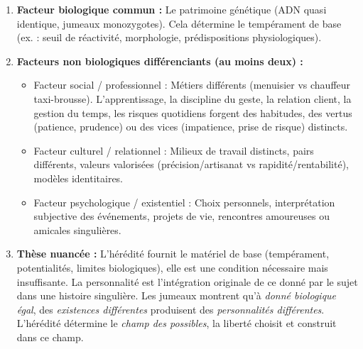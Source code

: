 \documentclass[11pt]{article}
\newcommand{\cle}[1]{{\popxbold\color{popdark}#1}}
\newcounter{popsec}
\newcounter{popsub}
\newcommand{\courssub}[1]{%
  \stepcounter{popsub}%
  \par\vspace{9pt}\noindent{\popxbold\fontsize{11.5}{13}\selectfont\color{popink}{\color{poporange}\thepopsec.\thepopsub}\hspace{6pt}#1}\par\nopagebreak\vspace{4pt}
}
\begin{document}
\courssub{Je m'entraîne}

\begin{corrige}
\begin{enumerate}
    \item \textbf{Facteur biologique commun :} Le \cle{patrimoine génétique} (ADN quasi identique, jumeaux monozygotes). Cela détermine le \cle{tempérament} de base (ex. : seuil de réactivité, morphologie, prédispositions physiologiques).
    \item \textbf{Facteurs non biologiques différenciants (au moins deux) :}
    \begin{itemize}
        \item \cle{Facteur social / professionnel :} Métiers différents (menuisier vs chauffeur taxi-brousse). L'apprentissage, la discipline du geste, la relation client, la gestion du temps, les risques quotidiens forgent des habitudes, des vertus (patience, prudence) ou des vices (impatience, prise de risque) distincts.
        \item \cle{Facteur culturel / relationnel :} Milieux de travail distincts, pairs différents, valeurs valorisées (précision/artisanat vs rapidité/rentabilité), modèles identitaires.
        \item \cle{Facteur psychologique / existentiel :} Choix personnels, interprétation subjective des événements, projets de vie, rencontres amoureuses ou amicales singulières.
    \end{itemize}
    \item \textbf{Thèse nuancée :} L'hérédité fournit le \cle{matériel de base} (tempérament, potentialités, limites biologiques), elle est une \cle{condition nécessaire} mais \cle{insuffisante}. La personnalité est l'\cle{intégration originale} de ce donné par le sujet dans une histoire singulière. Les jumeaux montrent qu'à \emph{donné biologique égal}, des \emph{existences différentes} produisent des \emph{personnalités différentes}. L'hérédité détermine le \emph{champ des possibles}, la liberté choisit et construit dans ce champ.
\end{enumerate}
\end{corrige}
\end{document}
